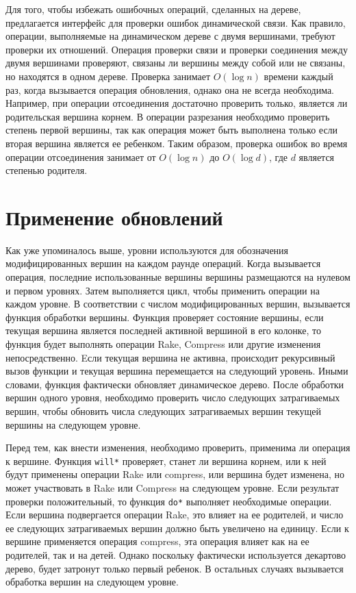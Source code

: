 \documentclass[specification,annotation]{itmo-student-thesis}
\begin{document}
Для того, чтобы избежать ошибочных операций, сделанных на дереве, предлагается интерфейс для проверки ошибок динамической связи. Как правило, операции, 
выполняемые на динамическом дереве с двумя вершинами, требуют проверки их отношений. Операция проверки связи и проверки соединения между двумя вершинами проверяют, связаны ли вершины между собой или не связаны, 
но находятся в одном дереве. Проверка занимает $O (\log n)$ времени каждый раз, когда вызывается операция обновления, однако она не всегда необходима. 
Например, при операции отсоединения достаточно проверить только, является ли родительская вершина корнем. В операции разрезания необходимо проверить степень первой вершины, так как операция может быть выполнена только если вторая вершина является ее ребенком. Таким образом, проверка ошибок во время операции отсоединения занимает от $O (\log n)$ до $O (\log d)$, где $d$ является степенью родителя.

\section{Применение обновлений}

Как уже упоминалось выше, уровни используются для обозначения модифицированных вершин на каждом раунде операций. Когда вызывается операция, последние использованные вершины вершины размещаются на
нулевом и первом уровнях. Затем выполняется цикл, чтобы применить операции на каждом уровне. В соответствии с числом модифицированных вершин, вызывается функция обработки вершины. Функция проверяет 
состояние вершины, если текущая вершина является последней активной вершиной в его колонке, то 
функция будет выполнять операции Rake, Compress или другие изменения непосредственно. Eсли текущая вершина не 
активна, происходит рекурсивный вызов функции и текущая вершина перемещается на следующий уровень. Иными словами, функция фактически обновляет динамическое дерево. После обработки вершин одного уровня, необходимо проверить число следующих затрагиваемых вершин, чтобы обновить числа следующих затрагиваемых вершин текущей вершины на следующем уровне.

Перед тем, как внести изменения, необходимо проверить, применима ли операция к вершине. Функция \texttt{will{\textunderscore}*} проверяет, станет ли вершина корнем, или к ней будут применены операции Rake или compress, или вершина будет изменена, но может участвовать в Rake или Compress на следующем уровне. Если результат проверки положительный, то функция \texttt{do{\textunderscore}*} выполняет необходимые операции. Если 
вершина подвергается операции Rake, 
это влияет на ее родителей, и число ее следующих затрагиваемых вершин должно быть увеличено на единицу. Если к вершине применяется операция compress, эта операция влияет как на ее родителей, так и на детей. Однако поскольку фактически используется декартово дерево, будет затронут только первый ребенок. В остальных случаях вызывается обработка вершин на следующем уровне.
\end{document}
